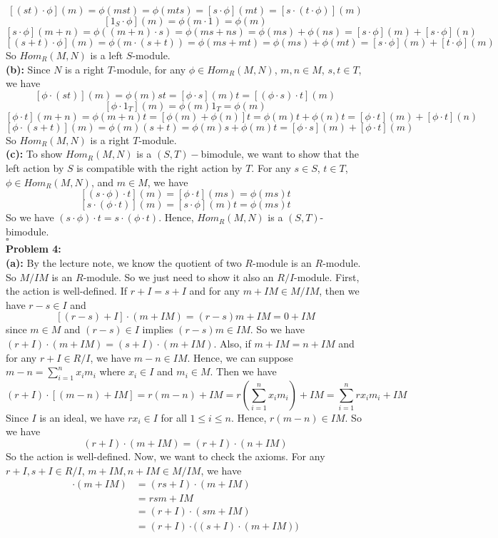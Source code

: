 \documentclass[12pt]{amsart}
\begin{document}
\[[(st)\cdot \phi](m)=\phi(mst)=\phi(mts)=[s\cdot \phi](mt)=[s\cdot (t\cdot \phi)](m)\tag{1}\]
\[[1_S\cdot\phi](m)=\phi(m\cdot 1)=\phi(m) \tag{2}\]
\[[s\cdot \phi](m+n)=\phi((m+n)\cdot s)=\phi(ms+ns)=\phi(ms)+\phi(ns)=[s\cdot \phi](m)+[s\cdot \phi](n)\tag{3}\]
\[[(s+t)\cdot \phi](m)=\phi(m\cdot (s+t))=\phi(ms+mt)=\phi(ms)+\phi(mt)=[s\cdot \phi](m)+[t\cdot \phi](m)\tag{4}\]
So $Hom_R(M,N)$ is a left $S$-module.\\
\textbf{(b):} Since $N$ is a right $T$-module, for any $\phi\in Hom_R(M,N)$, $m,n\in M$, $s,t\in T$, we have 
\[[\phi\cdot (st)](m)=\phi(m)st=[\phi\cdot s](m)t=[(\phi\cdot s)\cdot t](m)\tag{1}\]
\[[\phi\cdot 1_T](m)=\phi(m)1_T=\phi(m) \tag{2}\]
\[[\phi\cdot t](m+n)=\phi(m+n)t=[\phi(m)+\phi(n)]t=\phi(m)t+\phi(n)t=[\phi\cdot t](m)+[\phi\cdot t](n)\tag{3}\]
\[[\phi\cdot (s+t)](m)=\phi(m)(s+t)=\phi(m)s+\phi(m)t=[\phi\cdot s](m)+[\phi\cdot t](m)\tag{4}\]
So $Hom_R(M,N)$ is a right $T$-module.\\
\textbf{(c):} To show $Hom_R(M,N)$ is a $(S,T)-$bimodule, we want to show that the left action by $S$ is compatible with the right action by $T$. For any $s\in S$, $t\in T$, $\phi\in Hom_R(M,N)$, and $m\in M$, we have 
\[[(s\cdot \phi)\cdot t](m)=[\phi\cdot t](ms)=\phi(ms)t\]
\[[s\cdot (\phi\cdot t)](m)=[s\cdot \phi](m)t=\phi(ms)t\]
So we have $(s\cdot \phi) \cdot t=s\cdot (\phi \cdot t)$. Hence, $Hom_R(M,N)$ is a $(S,T)$-bimodule.
\\\phantom{qed}\hfill$\square$\\
\textbf{Problem 4:}\\
\textbf{(a):} By the lecture note, we know the quotient of two $R$-module is an $R$-module. So $M/IM$ is an $R$-module. So we just need to show it also an $R/I$-module. First, the action is well-defined. 
If $r+I=s+I$ and for any $m+IM\in M/IM$, then we have $r-s\in I$ and 
\[[(r-s)+I]\cdot(m+IM)=(r-s)m+IM=0+IM\]
since $m\in M$ and $(r-s)\in I$ implies $(r-s)m\in IM$. So we have $(r+I)\cdot (m+IM)=(s+I)\cdot(m+IM)$. Also, if $m+IM=n+IM$ and for any $r+I\in R/I$, we have $m-n\in IM$. Hence, we can suppose $m-n=\sum_{i=1}^nx_im_i$ where $x_i\in I$ and $m_i\in M$. Then we have
\[(r+I)\cdot [(m-n)+IM]=r(m-n)+IM=r(\sum_{i=1}^nx_im_i)+IM=\sum_{i=1}^nrx_im_i+IM\]
Since $I$ is an ideal, we have $rx_i\in I$ for all $1\leq i\leq n$. Hence, $r(m-n)\in IM$. So we have 
\[(r+I)\cdot (m+IM)=(r+I)\cdot (n+IM)\]
So the action is well-defined. Now, we want to check the axioms. For any $r+I,s+I\in R/I$, $m+IM,n+IM\in M/IM$, we have 
\begin{align*}
    [(r+I)(s+I)]\cdot (m+IM)&=(rs+ I)\cdot (m+IM)\\
    &=rsm+IM\\
    &=(r+I)\cdot (sm+IM)\\
    &=(r+I)\cdot \big((s+I)\cdot (m+IM)\big)
\tag{Axiom 1}\end{align*}
\end{document}
